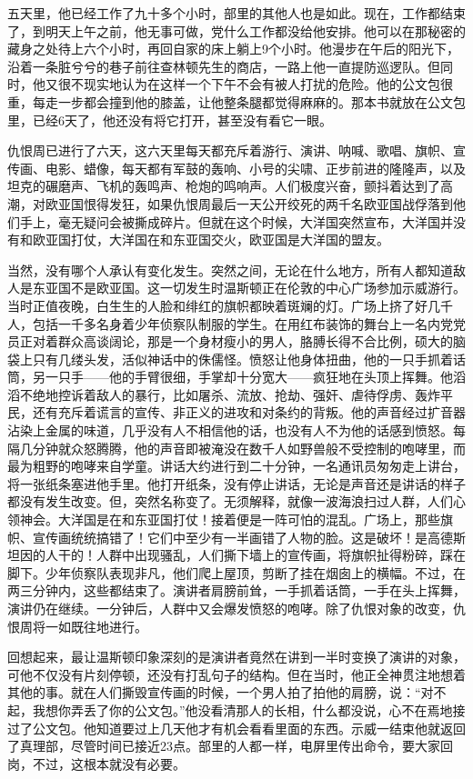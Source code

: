 五天里，他已经工作了九十多个小时，部里的其他人也是如此。现在，工作都结束了，到明天上午之前，他无事可做，党什么工作都没给他安排。他可以在那秘密的藏身之处待上六个小时，再回自家的床上躺上9个小时。他漫步在午后的阳光下，沿着一条脏兮兮的巷子前往查林顿先生的商店，一路上他一直提防巡逻队。但同时，他又很不现实地认为在这样一个下午不会有被人打扰的危险。他的公文包很重，每走一步都会撞到他的膝盖，让他整条腿都觉得麻麻的。那本书就放在公文包里，已经6天了，他还没有将它打开，甚至没有看它一眼。

仇恨周已进行了六天，这六天里每天都充斥着游行、演讲、呐喊、歌唱、旗帜、宣传画、电影、蜡像，每天都有军鼓的轰响、小号的尖啸、正步前进的隆隆声，以及坦克的碾磨声、飞机的轰鸣声、枪炮的鸣响声。人们极度兴奋，颤抖着达到了高潮，对欧亚国恨得发狂，如果仇恨周最后一天公开绞死的两千名欧亚国战俘落到他们手上，毫无疑问会被撕成碎片。但就在这个时候，大洋国突然宣布，大洋国并没有和欧亚国打仗，大洋国在和东亚国交火，欧亚国是大洋国的盟友。

当然，没有哪个人承认有变化发生。突然之间，无论在什么地方，所有人都知道敌人是东亚国不是欧亚国。这一切发生时温斯顿正在伦敦的中心广场参加示威游行。当时正值夜晚，白生生的人脸和绯红的旗帜都映着斑斓的灯。广场上挤了好几千人，包括一千多名身着少年侦察队制服的学生。在用红布装饰的舞台上一名内党党员正对着群众高谈阔论，那是一个身材瘦小的男人，胳膊长得不合比例，硕大的脑袋上只有几缕头发，活似神话中的侏儒怪。愤怒让他身体扭曲，他的一只手抓着话筒，另一只手——他的手臂很细，手掌却十分宽大——疯狂地在头顶上挥舞。他滔滔不绝地控诉着敌人的暴行，比如屠杀、流放、抢劫、强奸、虐待俘虏、轰炸平民，还有充斥着谎言的宣传、非正义的进攻和对条约的背叛。他的声音经过扩音器沾染上金属的味道，几乎没有人不相信他的话，也没有人不为他的话感到愤怒。每隔几分钟就众怒腾腾，他的声音即被淹没在数千人如野兽般不受控制的咆哮里，而最为粗野的咆哮来自学童。讲话大约进行到二十分钟，一名通讯员匆匆走上讲台，将一张纸条塞进他手里。他打开纸条，没有停止讲话，无论是声音还是讲话的样子都没有发生改变。但，突然名称变了。无须解释，就像一波海浪扫过人群，人们心领神会。大洋国是在和东亚国打仗！接着便是一阵可怕的混乱。广场上，那些旗帜、宣传画统统搞错了！它们中至少有一半画错了人物的脸。这是破坏！是高德斯坦因的人干的！人群中出现骚乱，人们撕下墙上的宣传画，将旗帜扯得粉碎，踩在脚下。少年侦察队表现非凡，他们爬上屋顶，剪断了挂在烟囱上的横幅。不过，在两三分钟内，这些都结束了。演讲者肩膀前耸，一手抓着话筒，一手在头上挥舞，演讲仍在继续。一分钟后，人群中又会爆发愤怒的咆哮。除了仇恨对象的改变，仇恨周将一如既往地进行。

回想起来，最让温斯顿印象深刻的是演讲者竟然在讲到一半时变换了演讲的对象，可他不仅没有片刻停顿，还没有打乱句子的结构。但在当时，他正全神贯注地想着其他的事。就在人们撕毁宣传画的时候，一个男人拍了拍他的肩膀，说：``对不起，我想你弄丢了你的公文包。''他没看清那人的长相，什么都没说，心不在焉地接过了公文包。他知道要过上几天他才有机会看看里面的东西。示威一结束他就返回了真理部，尽管时间已接近23点。部里的人都一样，电屏里传出命令，要大家回岗，不过，这根本就没有必要。

